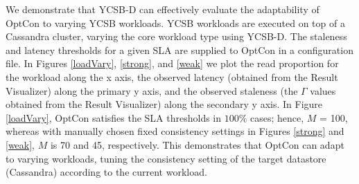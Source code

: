 \documentclass{vldb}
\begin{document}
  We demonstrate that YCSB-D can effectively evaluate the adaptability of OptCon to varying YCSB workloads. %
   YCSB workloads are executed on top of a Cassandra cluster, varying the core workload type using YCSB-D.
   The staleness and latency thresholds for a given SLA are supplied to OptCon in a configuration file.  In Figures \ref{loadVary}, \ref{strong},  and \ref{weak}
 we plot the read proportion for the workload along the x axis, the observed latency (obtained from the Result Visualizer) along the primary y axis, and the observed staleness (the {\boldmath$\Gamma$} values obtained from the Result Visualizer) along the secondary y axis. 
 In Figure \ref{loadVary}, OptCon satisfies the SLA thresholds in $100\%$ cases; hence, $M$ = 100, whereas with manually chosen fixed consistency settings in Figures \ref{strong}  and \ref{weak}, $M$ is 70 and 45, respectively.  
 This demonstrates that OptCon can adapt to varying workloads, tuning the consistency setting of the target datastore (Cassandra) according to the current workload. 
\end{document}

